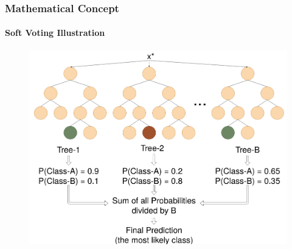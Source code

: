 \begin{frame}
    \frametitle{Mathematical Concept}
    \framesubtitle{Soft Voting Illustration}
    \begin{figure}
        \includegraphics[height=0.7\textheight]{images/soft.png}
    \end{figure}
\end{frame}
